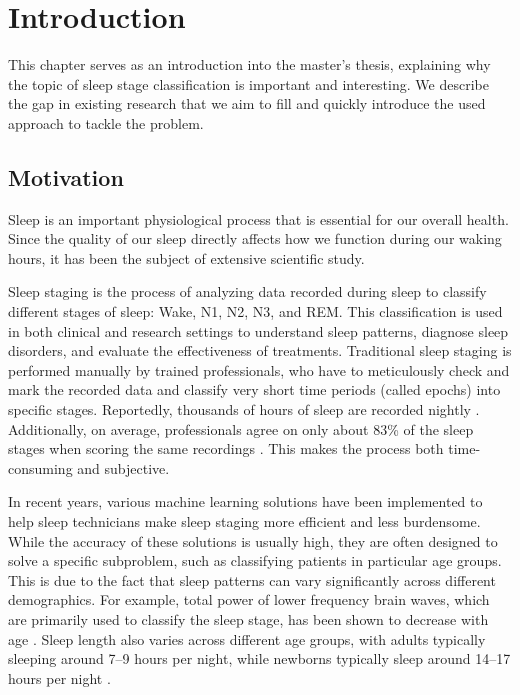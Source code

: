 \chapter{Introduction}
This chapter serves as an introduction into the master's thesis, explaining why 
the topic of sleep stage classification is important and interesting.
We describe the gap in existing research that we aim to fill
and quickly introduce the used approach to tackle the problem.

\section{Motivation} \label{sec:motivation}
Sleep is an important physiological process that is essential for our overall health.
Since the quality of our sleep directly affects how we function during our waking hours,
it has been the subject of extensive scientific study.

Sleep staging is the process of analyzing data recorded during sleep to classify
different stages of sleep: Wake, N1, N2, N3, and REM. 
This classification is used in both clinical and research
settings to understand sleep patterns, diagnose sleep disorders, and evaluate the
effectiveness of treatments. Traditional sleep staging is performed manually by trained
professionals, who have to meticulously check and mark the recorded data and classify
very short time periods (called epochs) into specific stages. Reportedly, thousands of hours of sleep are recorded nightly \cite{VallatWalker2021}. Additionally,
on average, professionals agree on only about 83\% of the sleep stages when scoring the same
recordings \cite{Rosenberg2013}. This makes the process both time-consuming and subjective.

In recent years, various machine learning solutions have been implemented 
to help sleep technicians make sleep staging more efficient and less burdensome.
While the accuracy of these solutions is usually high, they are often designed 
to solve a specific subproblem, such as classifying patients in particular age groups.
This is due to the fact that sleep patterns can vary significantly across different demographics. For example,
total power of lower frequency brain waves, which are primarily used to classify the sleep stage,
has been shown to decrease with age \cite{Greve2025}. 
Sleep length also varies across different age groups, with adults typically sleeping around 7–9 hours per night, while newborns typically sleep around 14–17 hours per night \cite{Hirshkowitz2015SleepDuration}.

